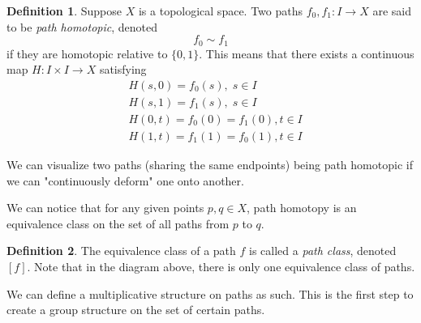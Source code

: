 \documentclass{article}
\theoremstyle{remark}
\theoremstyle{definition}
\newtheorem{definition}{Definition}[section]
\begin{document}
  \begin{definition}
  Suppose $X$ is a topological space. Two paths $f_0, f_1: I \longrightarrow X$ are said to be \textit{path homotopic}, denoted
  \[f_0 \sim f_1\]
  if they are homotopic relative to $\{0, 1\}$. This means that there exists a continuous map $H: I \times I \longrightarrow X$ satisfying
  \begin{align*}
      &H(s, 0) = f_0 (s), \; s \in I \\
      &H(s, 1) = f_1 (s), \; s \in I \\
      &H(0, t) = f_0 (0) = f_1 (0), t \in I \\
      &H(1, t) = f_1 (1) = f_0 (1) , t \in I
  \end{align*}
  \end{definition}
  We can visualize two paths (sharing the same endpoints) being path homotopic if we can "continuously deform" one onto another. 
  \begin{center}
  \end{center}
  We can notice that for any given points $p, q \in X$, path homotopy is an equivalence class on the set of all paths from $p$ to $q$. 

  \begin{definition}
  The equivalence class of a path $f$ is called a \textit{path class}, denoted $[f]$. Note that in the diagram above, there is only one equivalence class of paths. 
  \end{definition}

  We can define a multiplicative structure on paths as such. This is the first step to create a group structure on the set of certain paths. 
\end{document}
